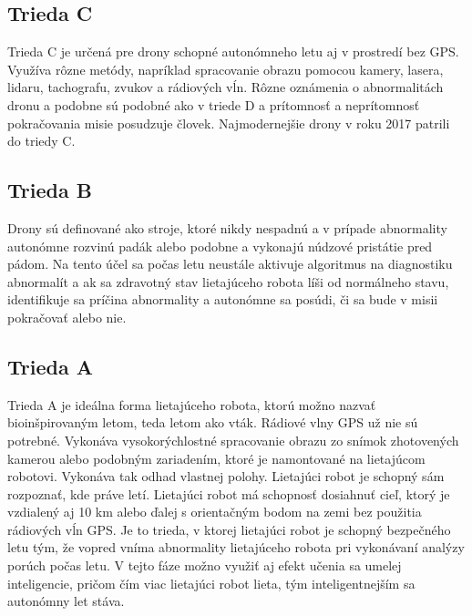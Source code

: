 \documentclass[10pt,twoside,slovak,a4paper]{article}
\begin{document}
\subsection{Trieda C}
Trieda C je určená pre drony schopné autonómneho letu aj v prostredí bez GPS. Využíva rôzne metódy, napríklad spracovanie obrazu pomocou kamery, lasera, lidaru, tachografu, zvukov a rádiových vĺn. Rôzne oznámenia o abnormalitách dronu a podobne sú podobné ako v triede D a prítomnosť a neprítomnosť pokračovania misie posudzuje človek. Najmodernejšie drony v roku 2017 patrili do triedy C. \cite{nonami2020present}

\subsection{Trieda B}
Drony sú definované ako stroje, ktoré nikdy nespadnú a v prípade abnormality autonómne rozvinú padák alebo podobne a vykonajú núdzové pristátie pred pádom. Na tento účel sa počas letu neustále aktivuje algoritmus na diagnostiku abnormalít a ak sa zdravotný stav lietajúceho robota líši od normálneho stavu, identifikuje sa príčina abnormality a autonómne sa posúdi, či sa bude v misii pokračovať alebo nie. \cite{nonami2020present}

\subsection{Trieda A}
Trieda A je ideálna forma lietajúceho robota, ktorú možno nazvať bioinšpirovaným letom, teda letom ako vták. Rádiové vlny GPS už nie sú potrebné. Vykonáva vysokorýchlostné spracovanie obrazu zo snímok zhotovených kamerou alebo podobným zariadením, ktoré je namontované na lietajúcom robotovi. Vykonáva tak odhad vlastnej polohy. Lietajúci robot je schopný sám rozpoznať, kde práve letí. Lietajúci robot má schopnosť dosiahnuť cieľ, ktorý je vzdialený aj 10 km alebo ďalej s orientačným bodom na zemi bez použitia rádiových vĺn GPS. Je to trieda, v ktorej lietajúci robot je schopný bezpečného letu tým, že vopred vníma abnormality lietajúceho robota pri vykonávaní analýzy porúch počas letu. V tejto fáze možno využiť aj efekt učenia sa umelej inteligencie, pričom čím viac lietajúci robot lieta, tým inteligentnejším sa autonómny let stáva. \cite{nonami2020present}
\end{document}
